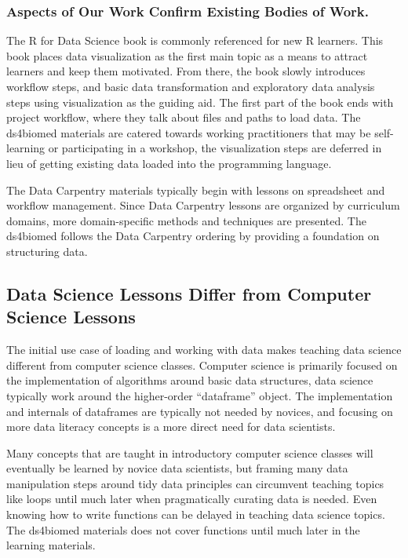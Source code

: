 \documentclass[030-workshop.tex]{subfiles}
\begin{document}
        \subsubsection{Aspects of Our Work Confirm Existing Bodies of Work.}

            The R for Data Science book is commonly referenced for new R learners.
            This book places data visualization as the first main topic as a means to attract learners and keep them motivated.
            From there, the book slowly introduces workflow steps, and basic data transformation and exploratory data analysis
            steps using visualization as the guiding aid.
            The first part of the book ends with project workflow, where they talk about files and paths to load data.
            The ds4biomed materials are catered towards working practitioners that may be self-learning or participating in a workshop,
            the visualization steps are deferred in lieu of getting existing data loaded into the programming language.

            The Data Carpentry materials typically begin with lessons on spreadsheet and workflow management.
            Since Data Carpentry lessons are organized by curriculum domains,
            more domain-specific methods and techniques are presented.
            The ds4biomed follows the Data Carpentry ordering by providing a foundation on structuring data.

    \subsection{Data Science Lessons Differ from Computer Science Lessons}

        The initial use case of loading and working with data makes teaching data science different from computer science classes.
        Computer science is primarily focused on the implementation of algorithms around basic data structures,
        data science typically work around the higher-order ``dataframe'' object.
        The implementation and internals of dataframes are typically not needed by novices,
        and focusing on more data literacy concepts is a more direct need for data scientists.

        Many concepts that are taught in introductory computer science classes will eventually be learned by novice data scientists,
        but framing many data manipulation steps around tidy data principles can circumvent
        teaching topics like loops until much later when pragmatically curating data is needed.
        Even knowing how to write functions can be delayed in teaching data science topics.
        The ds4biomed materials does not cover functions until much later in the learning materials.
\end{document}
